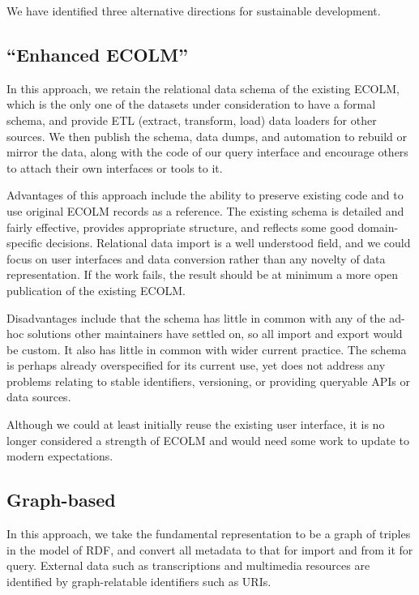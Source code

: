 \documentclass[sigconf]{acmart}
\begin{document}
\begin{sloppypar}
  We have identified three alternative directions for sustainable
  development.
  
  \subsection{``Enhanced ECOLM''}

  In this approach, we retain the relational data schema of the
  existing ECOLM, which is the only one of the datasets under
  consideration to have a formal schema, and provide ETL (extract,
  transform, load) data loaders for other sources. We then publish the
  schema, data dumps, and automation to rebuild or mirror the data,
  along with the code of our query interface and encourage others to
  attach their own interfaces or tools to it.

  Advantages of this approach include the ability to preserve existing
  code and to use original ECOLM records as a reference. The existing
  schema is detailed and fairly effective, provides appropriate
  structure, and reflects some good domain-specific
  decisions. Relational data import is a well understood field, and we
  could focus on user interfaces and data conversion rather than any
  novelty of data representation. If the work fails, the result should
  be at minimum a more open publication of the existing ECOLM.

  Disadvantages include that the schema has little in common with any
  of the ad-hoc solutions other maintainers have settled on, so all
  import and export would be custom. It also has little in common with
  wider current practice. The schema is perhaps already overspecified
  for its current use, yet does not address any problems relating to
  stable identifiers, versioning, or providing queryable APIs or data
  sources.

  Although we could at least initially reuse the existing user
  interface, it is no longer considered a strength of ECOLM and would
  need some work to update to modern expectations.

  \subsection{Graph-based}

  In this approach, we take the fundamental representation to be a
  graph of triples in the model of RDF, and convert all metadata to
  that for import and from it for query. External data such as
  transcriptions and multimedia resources are identified by
  graph-relatable identifiers such as URIs.


\end{sloppypar}
\end{document}

